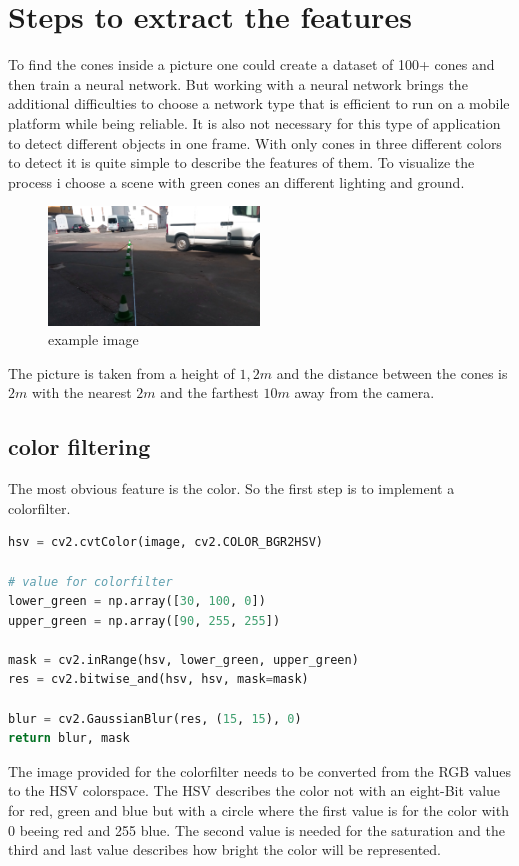 \documentclass[10pt,a4paper]{article}
\begin{document}
	\section{Steps to extract the features}
	To find the cones inside a picture one could create a dataset of 100+ cones and then train a neural network. But working with a neural network brings the additional difficulties to choose a network type that is efficient to run on a mobile platform while being reliable.
	It is also not necessary for this type of application to detect different objects in one frame.
	With only cones in three different colors to detect it is quite simple to describe the features of them.
	To visualize the process i choose a scene with green cones an different lighting and ground.
	\begin{figure}[h]
		\centering
		\includegraphics[width=0.5\textwidth]{Abb/start.png}
		\caption{example image}
		\label{example image}
	\end{figure}
	The picture is taken from a height of $1,2 m$ and the distance between the cones is $2m$ with the nearest $2m$ and the farthest $10m$ away from the camera.
	 
	\subsection{color filtering}
	The most obvious feature is the color. So the first step is to implement a colorfilter.
	\begin{lstlisting}[language=Python]
hsv = cv2.cvtColor(image, cv2.COLOR_BGR2HSV)
	
# value for colorfilter
lower_green = np.array([30, 100, 0])
upper_green = np.array([90, 255, 255])
	
mask = cv2.inRange(hsv, lower_green, upper_green)
res = cv2.bitwise_and(hsv, hsv, mask=mask)

blur = cv2.GaussianBlur(res, (15, 15), 0)
return blur, mask
	\end{lstlisting}
	The image provided for the colorfilter needs to be converted from the RGB values to the HSV colorspace.
	The HSV describes the color not with an eight-Bit value for red, green and blue but with a circle where the first value is for the color with 0 beeing red and 255 blue.
	The second value is needed for the saturation and the third and last value describes how bright the color will be represented.
	
\end{document}
